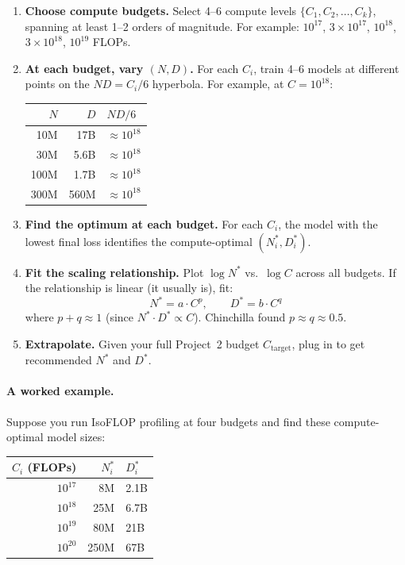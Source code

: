 \begin{enumerate}
  \item \textbf{Choose compute budgets.} Select 4--6 compute levels $\{C_1, C_2, \ldots, C_k\}$, spanning at least 1--2 orders of magnitude. For example: $10^{17}$, $3 \times 10^{17}$, $10^{18}$, $3 \times 10^{18}$, $10^{19}$ FLOPs.

  \item \textbf{At each budget, vary $(N, D)$.} For each $C_i$, train 4--6 models at different points on the $ND = C_i/6$ hyperbola. For example, at $C = 10^{18}$:

  \begin{center}
  \begin{tabular}{rrl}
  \toprule
  $N$ & $D$ & $ND/6$ \\
  \midrule
  10M & 17B & $\approx 10^{18}$ \\
  30M & 5.6B & $\approx 10^{18}$ \\
  100M & 1.7B & $\approx 10^{18}$ \\
  300M & 560M & $\approx 10^{18}$ \\
  \bottomrule
  \end{tabular}
  \end{center}

  \item \textbf{Find the optimum at each budget.} For each $C_i$, the model with the lowest final loss identifies the compute-optimal $(N^*_i, D^*_i)$.

  \item \textbf{Fit the scaling relationship.} Plot $\log N^*$ vs.\ $\log C$ across all budgets. If the relationship is linear (it usually is), fit:
  \[
  N^* = a \cdot C^p, \qquad D^* = b \cdot C^q
  \]
  where $p + q \approx 1$ (since $N^* \cdot D^* \propto C$). Chinchilla found $p \approx q \approx 0.5$.

  \item \textbf{Extrapolate.} Given your full Project~2 budget $C_{\text{target}}$, plug in to get recommended $N^*$ and $D^*$.
\end{enumerate}

\paragraph{A worked example.} Suppose you run IsoFLOP profiling at four budgets and find these compute-optimal model sizes:

\begin{center}
\begin{tabular}{rrl}
\toprule
$C_i$ (FLOPs) & $N^*_i$ & $D^*_i$ \\
\midrule
$10^{17}$ & 8M & 2.1B \\
$10^{18}$ & 25M & 6.7B \\
$10^{19}$ & 80M & 21B \\
$10^{20}$ & 250M & 67B \\
\bottomrule
\end{tabular}
\end{center}

